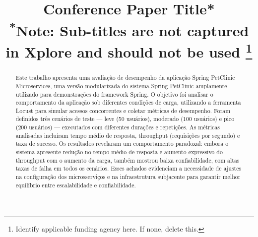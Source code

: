\documentclass[conference]{IEEEtran}
\begin{document}
    \title{Conference Paper Title*\\
    {\footnotesize \textsuperscript{*}Note: Sub-titles are not captured in Xplore and should not be used}
    \thanks{Identify applicable funding agency here. If none, delete this.}
    }

    \author{ 
    \and {} 
    \and {} 
    }

    \maketitle

    \begin{abstract}
        Este trabalho apresenta uma avaliação de desempenho da aplicação Spring PetClinic Microservices, uma versão modularizada do sistema Spring PetClinic amplamente utilizado para demonstrações do framework Spring. O objetivo foi analisar o comportamento da aplicação sob diferentes condições de carga, utilizando a ferramenta Locust para simular acessos concorrentes e coletar métricas de desempenho. Foram definidos três cenários de teste — leve (50 usuários), moderado (100 usuários) e pico (200 usuários) — executados com diferentes durações e repetições. As métricas analisadas incluíram tempo médio de resposta, throughput (requisições por segundo) e taxa de sucesso. Os resultados revelaram um comportamento paradoxal: embora o sistema apresente redução no tempo médio de resposta e aumento expressivo do throughput com o aumento da carga, também mostrou baixa confiabilidade, com altas taxas de falha em todos os cenários. Esses achados evidenciam a necessidade de ajustes na configuração dos microsserviços e na infraestrutura subjacente para garantir melhor equilíbrio entre escalabilidade e confiabilidade.
    \end{abstract}
\end{document}
